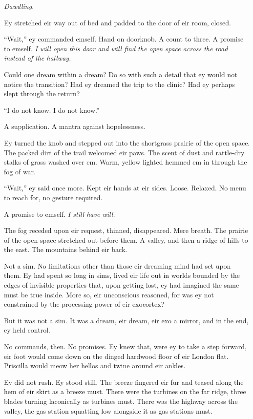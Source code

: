 \emph{Dawdling.}

Ey stretched eir way out of bed and padded to the door of eir room, closed.

``Wait,'' ey commanded emself. Hand on doorknob. A count to three. A promise to emself. \emph{I will open this door and will find the open space across the road instead of the hallway.}

Could one dream within a dream? Do so with such a detail that ey would not notice the transition? Had ey dreamed the trip to the clinic? Had ey perhaps slept through the return?

``I do not know. I do not know.''

A supplication. A mantra against hopelessness.

Ey turned the knob and stepped out into the shortgrass prairie of the open space. The packed dirt of the trail welcomed eir paws. The scent of dust and rattle-dry stalks of grass washed over em. Warm, yellow lighted hemmed em in through the fog of war.

``Wait,'' ey said once more. Kept eir hands at eir sides. Loose. Relaxed. No menu to reach for, no gesture required.

A promise to emself. \emph{I still have will.}

The fog receded upon eir request, thinned, disappeared. Mere breath. The prairie of the open space stretched out before them. A valley, and then a ridge of hills to the east. The mountains behind eir back.

Not a sim. No limitations other than those eir dreaming mind had set upon them. Ey had spent so long in sims, lived eir life out in worlds bounded by the edges of invisible properties that, upon getting lost, ey had imagined the same must be true inside. More so, eir unconscious reasoned, for was ey not constrained by the processing power of eir exocortex?

But it was not a sim. It was a dream, eir dream, eir exo a mirror, and in the end, ey held control.

No commands, then. No promises. Ey knew that, were ey to take a step forward, eir foot would come down on the dinged hardwood floor of eir London flat. Priscilla would meow her hellos and twine around eir ankles.

Ey did not rush. Ey stood still. The breeze fingered eir fur and teased along the hem of eir skirt as a breeze must. There were the turbines on the far ridge, three blades turning laconically as turbines must. There was the highway across the valley, the gas station squatting low alongside it as gas stations must.

